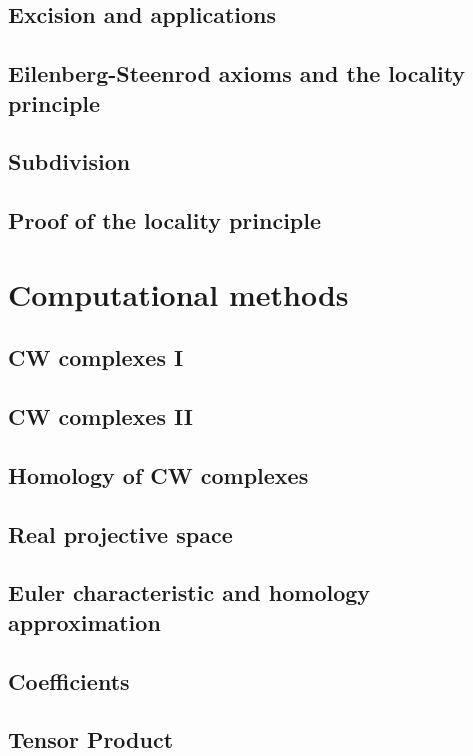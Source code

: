 \documentclass[oneside]{amsbook}
\numberwithin{ex}{section}
\begin{document}
\section{Excision and applications}

\section{Eilenberg-Steenrod axioms and the locality principle}

\section{Subdivision}

\section{Proof of the locality principle}


\chapter{Computational methods}
\section{CW complexes I}

\section{CW complexes II}

\section{Homology of CW complexes}

\section{Real projective space}

\section{Euler characteristic and homology approximation}

\section{Coefficients}

\section{Tensor Product}

\setcounter{section}{21}
\end{document}
